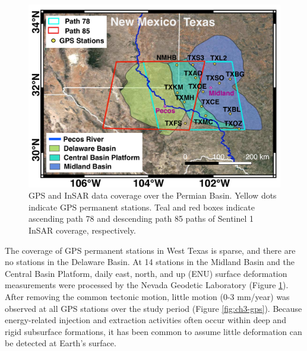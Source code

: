 \begin{figure}
	\centering
	\includegraphics[width=0.9\linewidth]{figures/chapter4-grl/figure1-study-area.pdf}
	\caption[GPS and InSAR data coverage over the Permian Basin.]{GPS and InSAR data coverage over the Permian Basin. Yellow dots indicate GPS permanent stations. Teal and red boxes indicate ascending path 78 and descending path 85 paths of Sentinel 1 InSAR coverage, respectively. 
}
	\label{fig:paper1-study-area}
\end{figure}




The coverage of GPS permanent stations in West Texas is sparse, and there are no stations in the Delaware Basin. At 14 stations in the Midland Basin and the Central Basin Platform, daily east, north, and up (ENU) surface deformation measurements were processed by the Nevada Geodetic Laboratory \citep{Blewitt2018HarnessingGpsData} (Figure \ref{fig:paper1-study-area}). After removing the common tectonic motion, little motion (0-3 mm/year) was observed at all GPS stations over the study period (Figure \ref{fig:ch3-gps}). Because energy-related injection and extraction activities often occur within deep and rigid subsurface formations, it has been common to assume little deformation can be detected at Earth's surface. 


